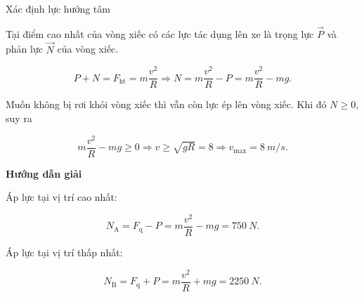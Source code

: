 \begin{dang}{Xác định lực hướng tâm}
{		Tại điểm cao nhất của vòng xiếc có các lực tác dụng lên xe là trọng lực $\vec P$ và phản lực  $\vec N$ của vòng xiếc.	
		
		$$P + N = F_\text{ht} = m \dfrac{v^2}{R} \Rightarrow N  =  m \dfrac{v^2}{R} - P =m \dfrac{v^2}{R}-mg .$$
		
		Muốn không bị rơi khỏi vòng xiếc thì vẫn còn lực ép lên vòng xiếc. Khi đó $N \geq 0 $, suy ra
		
		$$ m \dfrac{v^2}{R}-mg \geq 0 \Rightarrow v \geq \sqrt{gR} = 8 \Rightarrow v_\text{max} = \SI{8}{m/s}.$$
		
		
	}
	{	\begin{center}
			\textbf{Hướng dẫn giải}
		\end{center}
		
		Áp lực tại vị trí cao nhất:
		
		$$N_\text{A} = F_\text{q} - P = m \dfrac{v^2}{R} - mg =\SI{750}{N}.$$
		
		Áp lực tại vị trí thấp nhất:
		
		$$N_\text{B} = F_\text{q} + P = m \dfrac{v^2}{R} + mg =\SI{2250}{N}.$$
		
	}
\end{dang}


